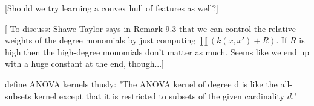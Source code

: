 [Should we try learning a convex hull of features as well?]

[ To discuss: Shawe-Taylor says in Remark 9.3 that we can control the relative weights of the degree monomials by just computing $\prod(k(x,x') + R)$.  If $R$ is high then the high-degree monomials don't matter as much.  Seems like we end up with a huge constant at the end, though...]

\cite{shawe2004kernel} define ANOVA kernels thusly: "The ANOVA kernel of degree d is like the all-subsets kernel except that it is restricted to subsets of the given cardinality $d$."




